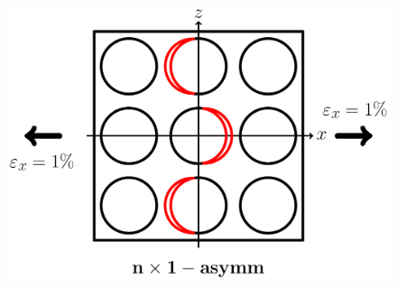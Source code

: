 \documentclass[first,firstsupp,lastsupp,last,hyperref,table]{ETHclass}
\begin{document}
\begin{frame}
\begin{columns}
\begin{column}{0.35\textwidth}
\begin{figure}
\end{figure}
\vspace{-0.5cm}
\begin{figure}
\centering
\includegraphics[width=\columnwidth]{twofibers-oppositeside-dtheta80.pdf}
\end{figure}
\end{column}
\end{columns}
\end{frame}
\end{document}
